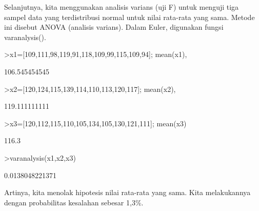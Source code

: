 \documentclass[12pt,arial,letterpaper]{book}
\begin{document}
\begin{eulercomment}
\begin{eulercomment}
\begin{eulercomment}
\begin{eulercomment}
\begin{eulercomment}
\begin{eulercomment}
\begin{eulercomment}
\begin{eulercomment}
\begin{eulercomment}
\begin{eulercomment}
\begin{eulercomment}
\begin{eulercomment}
\begin{eulercomment}
\begin{eulercomment}
\begin{eulercomment}
\begin{eulercomment}
\begin{eulercomment}
\begin{eulercomment}
\begin{eulercomment}
\begin{eulercomment}
\begin{eulercomment}
\begin{eulercomment}
\begin{eulercomment}
\begin{eulercomment}
\begin{eulercomment}
\begin{eulercomment}
\begin{eulercomment}
\begin{eulercomment}
\begin{eulercomment}
\begin{eulercomment}
\begin{eulercomment}
\begin{eulercomment}
\begin{eulercomment}
\begin{eulercomment}
\begin{eulercomment}
Selanjutnya, kita menggunakan analisis varians (uji F) untuk menguji
tiga sampel data yang terdistribusi normal untuk nilai rata-rata yang
sama. Metode ini disebut ANOVA (analisis varians). Dalam Euler,
digunakan fungsi varanalysis().
\end{eulercomment}
\begin{eulerprompt}
>x1=[109,111,98,119,91,118,109,99,115,109,94]; mean(x1),
\end{eulerprompt}
\begin{euleroutput}
  106.545454545
\end{euleroutput}
\begin{eulerprompt}
>x2=[120,124,115,139,114,110,113,120,117]; mean(x2),
\end{eulerprompt}
\begin{euleroutput}
  119.111111111
\end{euleroutput}
\begin{eulerprompt}
>x3=[120,112,115,110,105,134,105,130,121,111]; mean(x3)
\end{eulerprompt}
\begin{euleroutput}
  116.3
\end{euleroutput}
\begin{eulerprompt}
>varanalysis(x1,x2,x3)
\end{eulerprompt}
\begin{euleroutput}
  0.0138048221371
\end{euleroutput}
\begin{eulercomment}
Artinya, kita menolak hipotesis nilai rata-rata yang sama. Kita
melakukannya dengan probabilitas kesalahan sebesar 1,3\%.


\end{eulercomment}
\end{eulercomment}
\end{eulercomment}
\end{eulercomment}
\end{eulercomment}
\end{eulercomment}
\end{eulercomment}
\end{eulercomment}
\end{eulercomment}
\end{eulercomment}
\end{eulercomment}
\end{eulercomment}
\end{eulercomment}
\end{eulercomment}
\end{eulercomment}
\end{eulercomment}
\end{eulercomment}
\end{eulercomment}
\end{eulercomment}
\end{eulercomment}
\end{eulercomment}
\end{eulercomment}
\end{eulercomment}
\end{eulercomment}
\end{eulercomment}
\end{eulercomment}
\end{eulercomment}
\end{eulercomment}
\end{eulercomment}
\end{eulercomment}
\end{eulercomment}
\end{eulercomment}
\end{eulercomment}
\end{eulercomment}
\end{eulercomment}
\end{document}
